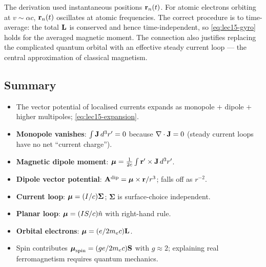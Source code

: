 \begin{remark}
  The derivation used instantaneous positions $\mathbf{r}_n(t)$.  For atomic electrons
  orbiting at $v\sim\alpha c$, $\mathbf{r}_n(t)$ oscillates at atomic frequencies.  The
  correct procedure is to time-average: the total $\mathbf{L}$ is conserved and hence
  time-independent, so \eqref{eq:lec15-gyro} holds for the averaged magnetic moment.
  The connection also justifies replacing the complicated quantum orbital with an
  effective steady current loop — the central approximation of classical magnetism.
\end{remark}

\subsection{Summary}\label{subsec:lec15-summary}

\begin{itemize}
  \item The vector potential of localised currents expands as monopole $+$ dipole
        $+$ higher multipoles; \eqref{eq:lec15-expansion}.
  \item \textbf{Monopole vanishes}: $\int\mathbf{J}\,d^3r' = 0$ because $\nabla\cdot\mathbf{J}=0$
        (steady current loops have no net ``current charge'').
  \item \textbf{Magnetic dipole moment}: $\boldsymbol{\mu} = \frac{1}{2c}\int\mathbf{r}'\times\mathbf{J}\,d^3r'$.
  \item \textbf{Dipole vector potential}: $\mathbf{A}^{\rm dip} = \boldsymbol{\mu}\times\mathbf{r}/r^3$;
        falls off as $r^{-2}$.
  \item \textbf{Current loop}: $\boldsymbol{\mu} = (I/c)\boldsymbol{\Sigma}$; $\boldsymbol{\Sigma}$
        is surface-choice independent.
  \item \textbf{Planar loop}: $\boldsymbol{\mu} = (IS/c)\hat{n}$ with right-hand rule.
  \item \textbf{Orbital electrons}: $\boldsymbol{\mu} = (e/2m_e c)\mathbf{L}$.
  \item Spin contributes $\boldsymbol{\mu}_{\rm spin} = (ge/2m_e c)\mathbf{S}$ with $g \approx 2$;
        explaining real ferromagnetism requires quantum mechanics.
\end{itemize}

